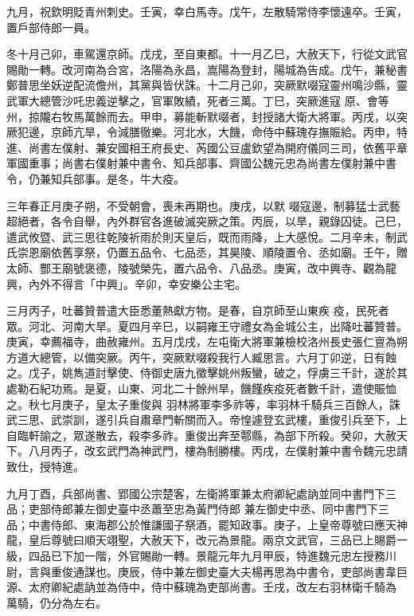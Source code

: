 \begin{pinyinscope}
 九月，祝欽明貶青州刺史。壬寅，幸白馬寺。戊午，左散騎常侍李懷遠卒。壬寅，置戶部侍郎一員。



 冬十月己卯，車駕還京師。戊戌，至自東都。十一月乙巳，大赦天下，行從文武官賜勛一轉。改河南為合宮，洛陽為永昌，嵩陽為登封，陽城為告成。戊午，兼秘書鄭普思坐妖逆配流儋州，其黨與皆伏誅。十二月己卯，突厥默啜寇靈州鳴沙縣，靈武軍大總管沙吒忠義逆擊之，官軍敗績，死者三萬。丁巳，突厥進寇
 原、會等州，掠隴右牧馬萬餘而去。甲申，募能斬默啜者，封授諸大衛大將軍。丙戌，以突厥犯邊，京師亢旱，令減膳徹樂。河北水，大饑，命侍中蘇瑰存撫賑給。丙申，特進、尚書左僕射、兼安國相王府長史、芮國公豆盧欽望為開府儀同三司，依舊平章軍國重事；尚書右僕射兼中書令、知兵部事、齊國公魏元忠為尚書左僕射兼中書令，仍兼知兵部事。是冬，牛大疫。



 三年春正月庚子朔，不受朝會，喪未再期也。庚戌，以默
 啜寇邊，制募猛士武藝超絕者，各令自舉，內外群官各進破滅突厥之策。丙辰，以旱，親錄囚徒。己巳，遣武攸暨、武三思往乾陵祈雨於則天皇后，既而雨降，上大感悅。二月辛未，制武氏崇恩廟依舊享祭，仍置五品令、七品丞，其昊陵、順陵置令、丞如廟。壬午，贈太師、酆王廟號褒德，陵號榮先，置六品令、八品丞。庚寅，改中興寺、觀為龍興，內外不得言「中興」。辛卯，幸安樂公主宅。



 三月丙子，吐蕃贊普遣大臣悉董熱獻方物。是春，自京師至山東疾
 疫，民死者眾。河北、河南大旱。夏四月辛巳，以嗣雍王守禮女為金城公主，出降吐蕃贊普。庚寅，幸薦福寺，曲赦雍州。五月戊戌，左屯衛大將軍兼檢校洛州長史張仁亶為朔方道大總管，以備突厥。丙午，突厥默啜殺我行人臧思言。六月丁卯逆，日有蝕之。戊子，姚雋道討擊使、侍御史唐九徵擊姚州叛蠻，破之，俘虜三千計，遂於其處勒石紀功焉。是夏，山東、河北二十餘州旱，饑饉疾疫死者數千計，遣使賑恤之。秋七月庚子，皇太子重俊與
 羽林將軍李多祚等，率羽林千騎兵三百餘人，誅武三思、武崇訓，遂引兵自肅章門斬關而入。帝惶遽登玄武樓，重俊引兵至下，上自臨軒諭之，眾遂散去，殺李多祚。重俊出奔至鄠縣，為部下所殺。癸卯，大赦天下。八月丙子，改玄武門為神武門，樓為制勝樓。丙戌，左僕射兼中書令魏元忠請致仕，授特進。



 九月丁酉，兵部尚書、郢國公宗楚客，左衛將軍兼太府卿紀處訥並同中書門下三品；吏部侍郎兼左御史臺中丞蕭至忠為黃門侍郎
 兼左御史中丞、同中書門下三品；中書侍郎、東海郡公於惟謙國子祭酒，罷知政事。庚子，上皇帝尊號曰應天神龍，皇后尊號曰順天翊聖，大赦天下，改元為景龍。兩京文武官，三品已上賜爵一級，四品已下加一階，外官賜勛一轉。景龍元年九月甲辰，特進魏元忠左授務川尉，言與重俊通謀也。庚辰，侍中兼左御史臺大夫楊再思為中書令，吏部尚書韋巨源、太府卿紀處訥並為侍中，侍中蘇瑰為吏部尚書。壬戌，改左右羽林衛千騎為
 萬騎，仍分為左右。




\end{pinyinscope}
